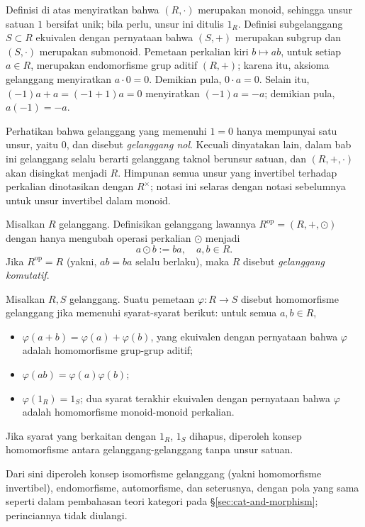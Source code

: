 Definisi di atas menyiratkan bahwa $(R, \cdot)$ merupakan monoid, sehingga unsur satuan $1$ bersifat unik; bila perlu, unsur ini ditulis $1_R$. Definisi subgelanggang $S \subset R$ ekuivalen dengan pernyataan bahwa $(S, +)$ merupakan subgrup dan $(S, \cdot)$ merupakan submonoid. Pemetaan perkalian kiri $b \mapsto ab$, untuk setiap $a \in R$, merupakan endomorfisme grup aditif $(R, +)$; karena itu, aksioma gelanggang menyiratkan $a \cdot 0 = 0$. Demikian pula, $0 \cdot a = 0$. Selain itu, $(-1)a + a = (-1 + 1) a = 0$ menyiratkan $(-1)a = -a$; demikian pula, $a(-1) = -a$.

Perhatikan bahwa gelanggang yang memenuhi $1=0$ hanya mempunyai satu unsur, yaitu $0$, dan disebut \emph{gelanggang nol}. Kecuali dinyatakan lain, dalam bab ini gelanggang selalu berarti gelanggang taknol berunsur satuan, dan $(R, +, \cdot)$ akan disingkat menjadi $R$. Himpunan semua unsur yang invertibel terhadap perkalian dinotasikan dengan $R^\times$; notasi ini selaras dengan notasi sebelumnya untuk unsur invertibel dalam monoid.

\begin{definition}
	Misalkan $R$ gelanggang. Definisikan gelanggang lawannya $R^\text{op} = (R, +, \odot)$ dengan hanya mengubah operasi perkalian $\odot$ menjadi
	\[ a \odot b := ba, \quad a, b \in R. \]
	Jika $R^\text{op}=R$ (yakni, $ab=ba$ selalu berlaku), maka $R$ disebut \emph{gelanggang komutatif}. 
\end{definition}

\begin{definition}
	Misalkan $R, S$ gelanggang. Suatu pemetaan $\varphi: R \to S$ disebut homomorfisme gelanggang jika memenuhi syarat-syarat berikut: untuk semua $a, b \in R$,
	\begin{itemize}
		\item $\varphi(a+b) = \varphi(a)+\varphi(b)$, yang ekuivalen dengan pernyataan bahwa $\varphi$ adalah homomorfisme grup-grup aditif;
		\item $\varphi(ab)=\varphi(a)\varphi(b)$;
		\item $\varphi(1_R) = 1_S$; dua syarat terakhir ekuivalen dengan pernyataan bahwa $\varphi$ adalah homomorfisme monoid-monoid perkalian.
	\end{itemize}
	Jika syarat yang berkaitan dengan $1_R$, $1_S$ dihapus, diperoleh konsep homomorfisme antara gelanggang-gelanggang tanpa unsur satuan.
\end{definition}
Dari sini diperoleh konsep isomorfisme gelanggang (yakni homomorfisme invertibel), endomorfisme, automorfisme, dan seterusnya, dengan pola yang sama seperti dalam pembahasan teori kategori pada \S\ref{sec:cat-and-morphism}; perinciannya tidak diulangi.

